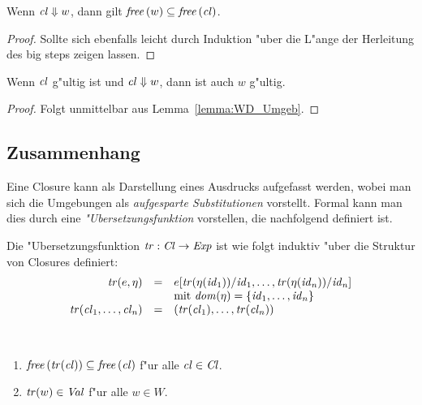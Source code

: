 \documentclass[12pt,fleqn,a4paper]{article}
\newcommand{\Cl}{\name{Cl}}
\newcommand{\cl}{\name{cl}}
\begin{document}
\begin{lemma} \label{lemma:WD_Umgeb}
  Wenn $\cl \Downarrow w$, dann gilt $\free{w} \subseteq \free{\cl}$.
\end{lemma}

\begin{proof}
  Sollte sich ebenfalls leicht durch Induktion "uber die L"ange der Herleitung des big steps zeigen lassen.
\end{proof}

\begin{corollary}
  Wenn $\cl$ g"ultig ist und $\cl \Downarrow w$, dann ist auch $w$ g"ultig.
\end{corollary}

\begin{proof}
  Folgt unmittelbar aus Lemma~\ref{lemma:WD_Umgeb}.
\end{proof}

\subsection{Zusammenhang}

Eine Closure kann als Darstellung eines Ausdrucks aufgefasst werden, wobei man sich die Umgebungen als
\emph{aufgesparte Substitutionen} vorstellt. Formal kann man dies durch eine \emph{"Ubersetzungsfunktion}
vorstellen, die nachfolgend definiert ist.

\begin{definition}["Ubersetzungsfunktion]
  Die "Ubersetzungsfunktion $\name{tr}:\Cl \to \Exp$ ist wie folgt induktiv "uber die Struktur von Closures
  definiert:
  \[\begin{array}{rcl}
    \tr{e,\eta} &=& e[\tr{\eta(\id_1)}/\id_1,\ldots,\tr{\eta(\id_n)}/\id_n] \\
    && \text{mit } \dom{\eta} = \{\id_1,\ldots,\id_n\} \\
    \tr{\cl_1,\ldots,\cl_n} &=& (\tr{\cl_1},\ldots,\tr{\cl_n}) \\
  \end{array}\]
\end{definition}

\begin{lemma} \
  \begin{enumerate}
  \item $\free{\tr{\cl}} \subseteq \free{\cl}$ f"ur alle $\cl \in \Cl$.
  \item ${\text{\it tr\/}}(w) \in {\text{\it Val\/}}$ f"ur alle $w \in W$.
  \end{enumerate}
\end{lemma}
\end{document}
